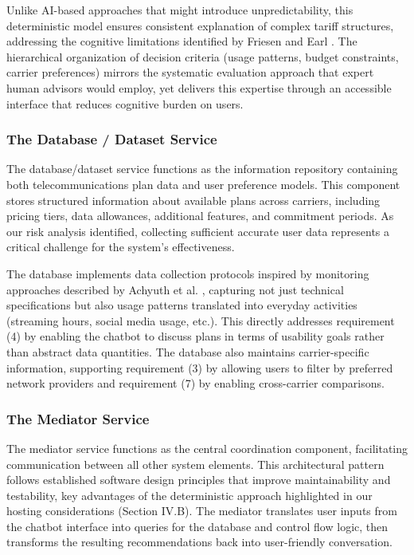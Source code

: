 \documentclass[conference]{IEEEtran}
\begin{document}
Unlike AI-based approaches that might introduce unpredictability, this deterministic model ensures consistent explanation of complex tariff structures, addressing the cognitive limitations identified by Friesen and Earl \cite{b1}. The hierarchical organization of decision criteria (usage patterns, budget constraints, carrier preferences) mirrors the systematic evaluation approach that expert human advisors would employ, yet delivers this expertise through an accessible interface that reduces cognitive burden on users.

\subsubsection{The Database / Dataset Service}
The database/dataset service functions as the information repository containing both telecommunications plan data and user preference models. This component stores structured information about available plans across carriers, including pricing tiers, data allowances, additional features, and commitment periods. As our risk analysis identified, collecting sufficient accurate user data represents a critical challenge for the system's effectiveness.

The database implements data collection protocols inspired by monitoring approaches described by Achyuth et al. \cite{b6}, capturing not just technical specifications but also usage patterns translated into everyday activities (streaming hours, social media usage, etc.). This directly addresses requirement (4) by enabling the chatbot to discuss plans in terms of usability goals rather than abstract data quantities. The database also maintains carrier-specific information, supporting requirement (3) by allowing users to filter by preferred network providers and requirement (7) by enabling cross-carrier comparisons.

\subsubsection{The Mediator Service}
The mediator service functions as the central coordination component, facilitating communication between all other system elements. This architectural pattern follows established software design principles that improve maintainability and testability, key advantages of the deterministic approach highlighted in our hosting considerations (Section IV.B). The mediator translates user inputs from the chatbot interface into queries for the database and control flow logic, then transforms the resulting recommendations back into user-friendly conversation.
\end{document}
